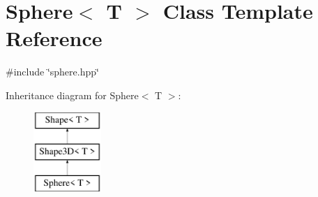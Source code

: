 \hypertarget{classSphere}{}\section{Sphere$<$ T $>$ Class Template Reference}
\label{classSphere}


{\ttfamily \#include \char`\"{}sphere.\+hpp\char`\"{}}

Inheritance diagram for Sphere$<$ T $>$\+:\begin{figure}[H]
\begin{center}
\leavevmode
\includegraphics[height=3.000000cm]{classSphere}
\end{center}
\end{figure}
